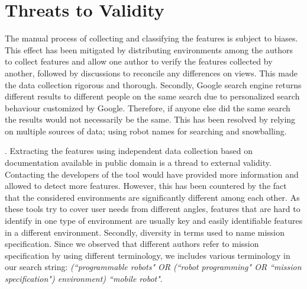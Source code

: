 \section{Threats to Validity}
The manual process of collecting and classifying  the features is subject to biases.
This effect has been mitigated by distributing environments among the authors to collect features and allow one author to verify the features collected by another, followed by discussions to reconcile any differences on views. This made the data collection rigorous and thorough. Secondly, Google search engine returns different results to different people on the same search due to personalized search behaviour customized by Google. Therefore, if anyone else did the same search the results would not necessarily be the same. This has been resolved by relying on multiple sources of data; using robot names for searching and snowballing.

. Extracting the features using independent data collection based on documentation available in public domain is a thread to external validity. Contacting the developers of the tool would have provided more information and allowed to detect more features. 
However, this has been countered by the fact that the considered environments are significantly different among each other. As these tools try to cover user needs from different angles, features that are hard to identify in one type of environment are usually key and easily identifiable features in a different environment.
Secondly, diversity in terms used to name mission specification. Since we observed that different authors refer to mission specification by using different terminology, we includes various terminology in our search string: \emph{(``programmable robots" OR (``robot programming" OR ``mission specification") environment) ``mobile robot"}. 
